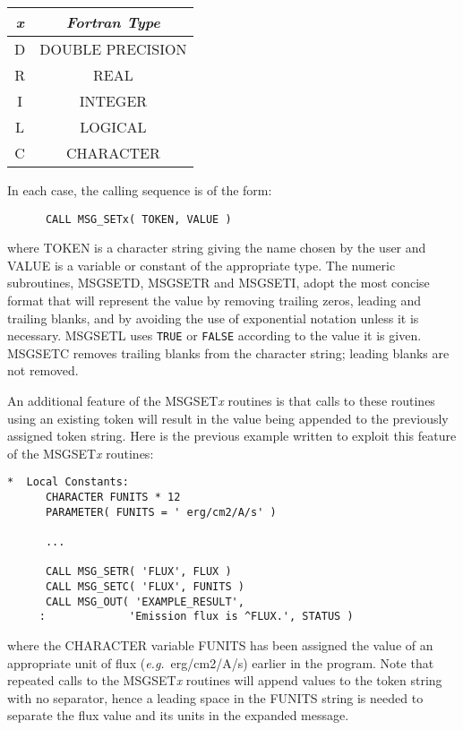 \documentclass[twoside,11pt]{article}
\renewcommand{\_}{\texttt{\symbol{95}}}
\begin{document}
\begin {center}
\begin {tabular}{||c|c||}
\hline
\textit{x} & \textit{Fortran Type}\\
\hline
D & DOUBLE PRECISION\\
R & REAL\\
I & INTEGER\\
L & LOGICAL\\
C & CHARACTER\\
\hline
\end {tabular}
\end {center}

In each case, the calling sequence is of the form:

\begin {small}
\begin{verbatim}
      CALL MSG_SETx( TOKEN, VALUE )
\end{verbatim}
\end {small}

where TOKEN is a character string giving the name chosen by the user and VALUE
is a variable or constant of the appropriate type.
The numeric subroutines, MSG\_SETD, MSG\_SETR and MSG\_SETI, adopt the most
concise format that will represent the value by removing trailing zeros,
leading and trailing blanks, and by avoiding the use of exponential notation
unless it is necessary. 
MSG\_SETL uses \texttt{TRUE} or \texttt{FALSE} according to the value it is
given. MSG\_SETC removes trailing blanks from the character string; leading
blanks are not removed.

An additional feature of the MSG\_SET\textit{x} routines is that calls to these 
routines using an existing token will result in the value being appended 
to the previously assigned token string.
Here is the previous example written to exploit this feature of the 
MSG\_SET\textit{x} routines:

\begin {small}
\begin{verbatim}
*  Local Constants:
      CHARACTER FUNITS * 12
      PARAMETER( FUNITS = ' erg/cm2/A/s' )

      ...

      CALL MSG_SETR( 'FLUX', FLUX )
      CALL MSG_SETC( 'FLUX', FUNITS )
      CALL MSG_OUT( 'EXAMPLE_RESULT', 
     :             'Emission flux is ^FLUX.', STATUS )
\end{verbatim}
\end {small}

where the CHARACTER variable FUNITS has been assigned the value of an 
appropriate unit of flux (\textit{e.g.}\ erg/cm2/A/s) earlier in the program.
Note that repeated calls to the MSG\_SET\textit{x} routines will append values 
to the token string with no separator, hence a leading space in the FUNITS 
string is needed to separate the flux value and its units in the expanded 
message.
\end{document}
